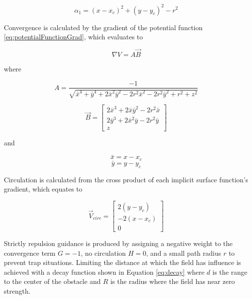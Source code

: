 \documentclass[conf]{new-aiaa}
\begin{document}
\begin{equation}\label{eq:alphaCylinder}
\alpha_1 = (x-x_c)^2 + (y-y_c)^2-r^2
\end{equation}


Convergence is calculated by the gradient of the potential function \ref{eq:potentialFunctionGrad}, which evaluates to

\begin{equation}
\nabla V = A\overrightarrow{B}
\end{equation}

where


\begin{equation}
A = \dfrac{-1}{\sqrt{\bar{x}^4+\bar{y}^4+2\bar{x}^2\bar{y}^2-2r^2\bar{x}^2-2r^2\bar{y}^2+r^2+z^2}}
\end{equation}

\begin{equation}
\overrightarrow{B} = \begin{bmatrix} 2\bar{x}^3+2\bar{x}\bar{y}^2-2r^2\bar{x} \\ 2\bar{y}^3+2\bar{x}^2\bar{y}-2r^2\bar{y} \\z \end{bmatrix}
\end{equation}

and


\begin{equation}
\bar{x} = x - x_c
\end{equation}
\begin{equation}
\bar{y} = y - y_c
\end{equation}

Circulation is calculated from the cross product of each implicit surface function's gradient, which equates to

\begin{equation}\label{eq:vcirc_circle}
\overrightarrow{V}_{circ} =  \begin{bmatrix}  2(y-y_c) \\[6pt] -2(x-x_c) \\[6pt] 0\end{bmatrix}
\end{equation}



Strictly repulsion guidance is produced by assigning a negative weight to the convergence term $G=-1$, no circulation $H=0$, and a small path radius $r$ to prevent trap situations. Limiting the distance at which the field has influence is achieved with a decay function shown in Equation \ref{eq:decay} where $d$ is the range to the center of the obstacle and $R$ is the radius where the field has near zero strength. 
\end{document}
